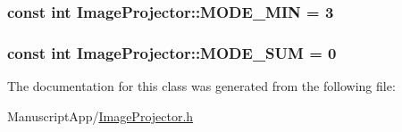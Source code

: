 \hypertarget{class_image_projector_a18c6aaf382882c18e38fba9058348d4b}{
\subsubsection[{M\+O\+D\+E\+\_\+\+M\+I\+N}]{\setlength{\rightskip}{0pt plus 5cm}const int Image\+Projector\+::\+M\+O\+D\+E\+\_\+\+M\+I\+N = 3\hspace{0.3cm}{\ttfamily [static]}}}\label{class_image_projector_a18c6aaf382882c18e38fba9058348d4b}
\hypertarget{class_image_projector_aa4f984418252e6203b04e4dcb5ab8183}{
\subsubsection[{M\+O\+D\+E\+\_\+\+S\+U\+M}]{\setlength{\rightskip}{0pt plus 5cm}const int Image\+Projector\+::\+M\+O\+D\+E\+\_\+\+S\+U\+M = 0\hspace{0.3cm}{\ttfamily [static]}}}\label{class_image_projector_aa4f984418252e6203b04e4dcb5ab8183}


The documentation for this class was generated from the following file\+:\begin{DoxyCompactItemize}
\item 
Manuscript\+App/\hyperlink{_image_projector_8h}{Image\+Projector.\+h}\end{DoxyCompactItemize}
